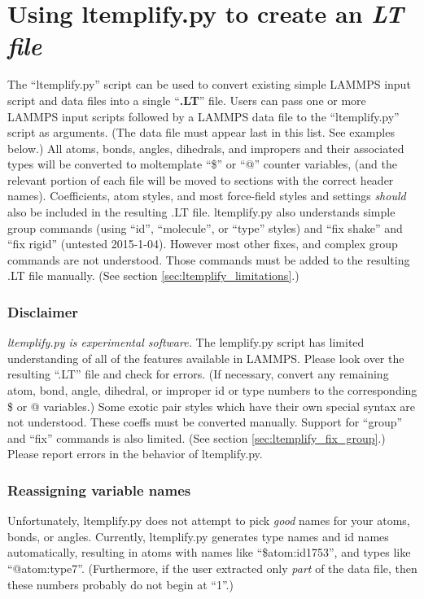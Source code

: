 \documentclass[11pt]{article}
\begin{document}
\section{Using ltemplify.py to create an \textit{LT file}}
\label{sec:ltemplify}

The ``ltemplify.py'' script can be used to convert existing simple LAMMPS
input script and data files into a single ``\textbf{.LT}'' file.
Users can pass one or more LAMMPS input scripts followed by a LAMMPS data file
to the ``ltemplify.py'' script as arguments.
(The data file must appear last in this list. See examples below.)
All atoms, bonds, angles, dihedrals, and impropers and their associated types
will be converted to moltemplate ``\$'' or ``@'' counter variables, 
(and the relevant portion of each file will be moved to sections with the
correct header names).  Coefficients, atom styles, and 
most force-field styles and settings \textit{should} also 
be included in the resulting .LT file.  
ltemplify.py also understands simple group commands 
(using ``id'', ``molecule'', or ``type'' styles)
and ``fix shake'' and ``fix rigid'' (untested 2015-1-04).
However most other fixes, and complex group commands are not understood.
Those commands must be added to the resulting .LT file manually.
(See section \ref{sec:ltemplify_limitations}.)

\subsubsection*{Disclaimer}

\textit{ltemplify.py is experimental software.}
The lemplify.py script has limited understanding of all of the features
available in LAMMPS.
Please look over the resulting ``.LT'' file and check for errors.
(If necessary, convert any remaining
atom, bond, angle, dihedral, or improper id or type numbers to the
corresponding \$ or @ variables.)
Some exotic pair styles which have their own special syntax 
are not understood.
These coeffs must be converted manually.
Support for ``group'' and ``fix'' commands is also limited.
(See section \ref{sec:ltemplify_fix_group}.)
Please report errors in the behavior of ltemplify.py.

\subsubsection*{Reassigning variable names}

Unfortunately, ltemplify.py does not attempt to pick \textit{good}
names for your atoms, bonds, or angles.
Currently, ltemplify.py generates type names and id names automatically,
resulting in atoms with names like ``\$atom:id1753'',
and types like ``@atom:type7''.
(Furthermore, if the user 
extracted only \textit{part} of the data file, then these 
numbers probably do not begin at ``1''.)
\end{document}
